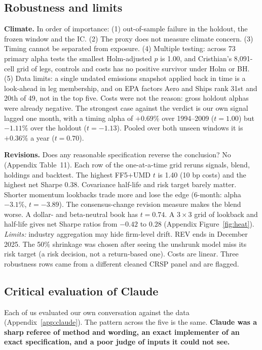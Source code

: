 \documentclass[11pt]{article}
\begin{document}
\subsection{Robustness and limits}
\label{sec:robust}

\textbf{Climate.} In order of importance: (1) out-of-sample failure in the holdout, the frozen window and the IC. (2) The proxy does not measure climate concern. (3) Timing cannot be separated from exposure. (4) Multiple testing: across 73 primary alpha tests the smallest Holm-adjusted $p$ is 1.00, and Cristhian's 8,091-cell grid of legs, controls and costs has no positive survivor under Holm or BH. (5) Data limits: a single undated emissions snapshot applied back in time is a look-ahead in leg membership, and on EPA factors Aero and Ships rank 31st and 20th of 49, not in the top five. Costs were not the reason: gross holdout alphas were already negative. The strongest case against the verdict is our own signal lagged one month, with a timing alpha of $+0.69\%$ over 1994--2009 ($t=1.00$) but $-1.11\%$ over the holdout ($t=-1.13$). Pooled over both unseen windows it is $+0.36\%$ a year ($t=0.70$).

\textbf{Revisions.} Does any reasonable specification reverse the conclusion? No (Appendix Table~11). Each row of the one-at-a-time grid reruns signals, blend, holdings and backtest. The highest FF5+UMD $t$ is 1.40 (10 bp costs) and the highest net Sharpe 0.38. Covariance half-life and risk target barely matter. Shorter momentum lookbacks trade more and lose the edge (6-month: alpha $-3.1\%$, $t=-3.89$). The consensus-change revision measure makes the blend worse. A dollar- and beta-neutral book has $t=0.74$. A $3\times3$ grid of lookback and half-life gives net Sharpe ratios from $-0.42$ to $0.28$ (Appendix Figure~\ref{fig:heat}). \emph{Limits:} industry aggregation may hide firm-level drift. REV ends in December 2025. The 50\% shrinkage was chosen after seeing the unshrunk model miss its risk target (a risk decision, not a return-based one). Costs are linear. Three robustness rows came from a different cleaned CRSP panel and are flagged.

\subsection{Critical evaluation of Claude}
\label{sec:claude}

Each of us evaluated our own conversation against the data (Appendix~\ref{app:claude}). The pattern across the five is the same. \textbf{Claude was a sharp referee of method and wording, an exact implementer of an exact specification, and a poor judge of inputs it could not see.}
\end{document}
